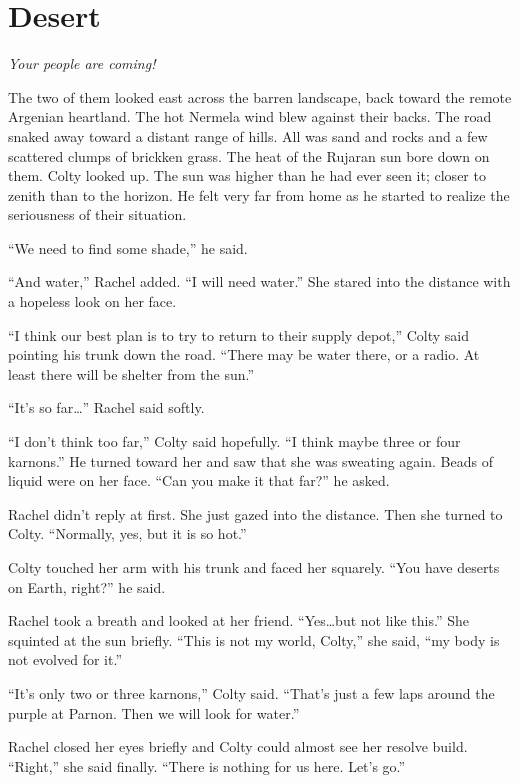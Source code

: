 
\chapter{Desert}

\textit{Your people are coming!}

\breakpoint

The two of them looked east across the barren landscape, back toward the remote Argenian
heartland. The hot Nermela wind blew against their backs. The road snaked away toward a distant
range of hills. All was sand and rocks and a few scattered clumps of brickken grass. The heat of
the Rujaran sun bore down on them. Colty looked up. The sun was higher than he had ever seen
it; closer to zenith than to the horizon. He felt very far from home as he started to realize
the seriousness of their situation.

``We need to find some shade,'' he said.

``And water,'' Rachel added. ``I will need water.'' She stared into the distance with a hopeless
look on her face.

``I think our best plan is to try to return to their supply depot,'' Colty said pointing his
trunk down the road. ``There may be water there, or a radio. At least there will be shelter from
the sun.''

``It's so far\ldots'' Rachel said softly.

``I don't think too far,'' Colty said hopefully. ``I think maybe three or four karnons.'' He
turned toward her and saw that she was sweating again. Beads of liquid were on her face. ``Can
you make it that far?'' he asked.

Rachel didn't reply at first. She just gazed into the distance. Then she turned to Colty.
``Normally, yes, but it is so hot.''

Colty touched her arm with his trunk and faced her squarely. ``You have deserts on Earth,
right?'' he said.

Rachel took a breath and looked at her friend. ``Yes\ldots but not like this.'' She squinted at
the sun briefly. ``This is not my world, Colty,'' she said, ``my body is not evolved for it.''

``It's only two or three karnons,'' Colty said. ``That's just a few laps around the purple at
Parnon. Then we will look for water.''

Rachel closed her eyes briefly and Colty could almost see her resolve build. ``Right,'' she said
finally. ``There is nothing for us here. Let's go.''

